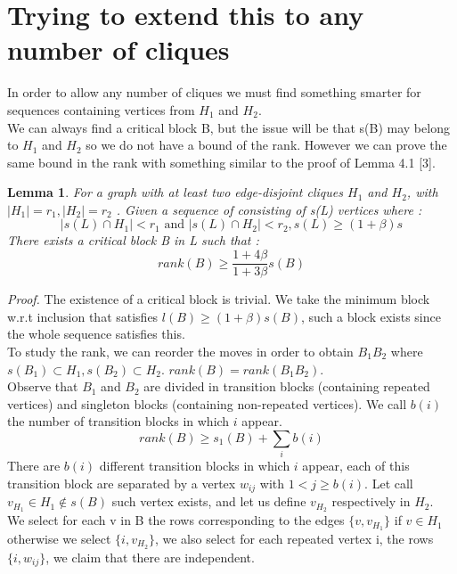 \documentclass[12pt]{article}
\newtheorem{lemma}[theorem]{Lemma}
\begin{document}
\section{Trying to extend this to any number of cliques}

In order to allow any number of cliques we must find something smarter for sequences containing vertices from $H_1$ and $H_2$.\\
We can always find a critical block B, but the issue will be that  s(B) may belong to $H_1$ and $H_2$ so we do not have a bound of the rank. However we can prove the same bound in the rank with something similar to the proof of Lemma 4.1 [3].\\


\begin{lemma}
For a graph with at least two edge-disjoint cliques $H_1$ and $H_2$, with $|H_1| = r_1, |H_2| = r_2$  . Given a sequence of consisting of s(L) vertices where : 
\begin{equation*}
|s(L) \cap H_1| < r_1\text{ and } |s(L) \cap H_2| < r_2, s(L) \geq (1 + \beta)s
\end{equation*}
There exists a critical block B in L such that :
\begin{equation*}
rank(B) \geq \frac{1 +4\beta}{1 + 3\beta}s(B)
\end{equation*}
\end{lemma}

\textit{Proof.} The existence of a critical block is trivial. We take the minimum block w.r.t inclusion that satisfies $l(B) \geq (1 +  \beta)s(B)$, such a block exists since the whole sequence satisfies this.\\
To study the rank, we can reorder the moves in order to obtain $B_1B_2$ where $s(B_1) \subset H_1, s(B_2) \subset H_2$.
$rank(B) = rank(B_1B_2)$. \\
Observe that $B_1$ and $B_2$ are divided in transition blocks (containing repeated vertices) and singleton blocks (containing non-repeated vertices). We call $b(i)$ the number of transition blocks in which $i$ appear.
\begin{equation*}
rank(B) \geq s_1(B) + \sum_i b(i)
\end{equation*}
There are $b(i)$ different transition blocks in which $i$ appear, each of this transition block are separated by a vertex $w_{ij}$ with $1 <j \geq b(i)$. Let call $v_{H_1} \in H_1 \not \in s(B)$ such vertex exists, and let us define $v_{H_2}$ respectively in $H_2$. \\
We select for each v in B the rows corresponding to the edges $\{v, v_{H_1}\}$ if $v \in H_1$ otherwise we select $\{i, v_{H_2}\}$, we also select for each repeated vertex i, the rows $\{i, w_{ij}\}$, we claim that there are independent.\\
\end{document}
